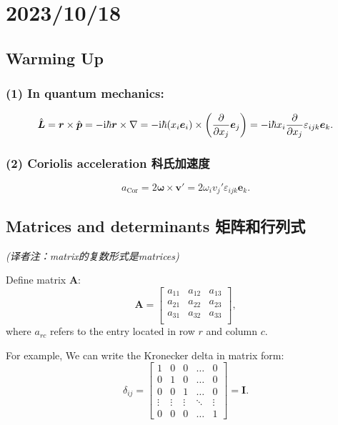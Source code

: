 \chapter{2023/10/18}\label{20231018}

\section{Warming Up}\label{warming-up}

\subsection*{(1) In quantum mechanics:}\label{in-quantum-mechanics}

\[\hat {\boldsymbol L} = \boldsymbol r \times \hat {\boldsymbol p} = - \mathrm i \hbar \boldsymbol r \times \nabla = - \mathrm i \hbar (x_i \boldsymbol e_i) \times \left({\partial \over \partial x_j }\boldsymbol e_j\right)= - \mathrm i \hbar x_i {\partial \over \partial x_j } \varepsilon_{ijk} \boldsymbol e_k.\]

\subsection*{(2) Coriolis acceleration
科氏加速度}\label{coriolis-acceleration-ux79d1ux6c0fux52a0ux901fux5ea6}

\[a_\text{Cor} = 2 \boldsymbol \omega \times \boldsymbol v' = 2 \omega_i v_j' \varepsilon_{ijk} \boldsymbol e_k.\]

\section{Matrices and determinants
矩阵和行列式}\label{matrices-and-determinants-ux77e9ux9635ux548cux884cux5217ux5f0f}

\emph{(译者注：matrix的复数形式是matrices)}

Define matrix \(\mathbf A\): \[\mathbf A=
\begin{bmatrix}
    a_{11} & a_{12} & a_{13} \\
    a_{21} & a_{22} & a_{23} \\
    a_{31} & a_{32} & a_{33} \\
\end{bmatrix},\] where \(a_{rc}\) refers to the entry located in row
\(r\) and column \(c\).

For example, We can write the Kronecker delta in matrix form:
\[\delta_{ij} = \begin{bmatrix}
    1 & 0 & 0 & \ldots & 0 \\
    0 & 1 & 0 & \ldots & 0 \\
    0 & 0 & 1 & \ldots & 0 \\
    \vdots & \vdots & \vdots & \ddots & \vdots \\
    0 & 0 & 0 & \ldots & 1
\end{bmatrix} = \mathbf{I}.\]

